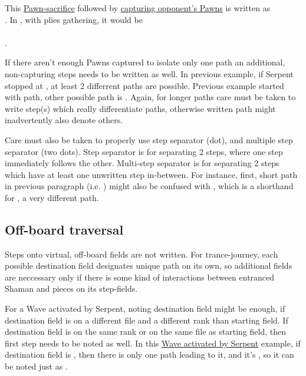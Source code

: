 This \hyperref[fig:scn_tr_13_pawn_sacrifice_init]{Pawn-sacrifice} followed by
\hyperref[fig:scn_tr_14_pawn_sacrifice_end]{capturing opponent's Pawns} is written as \\
. In , with plies
gathering, it would be \\
\alg{[Sr14-m15]\~{}[Am15-m11];;}\\
\alg{[Sm15..m17*..m19*.l20*.m21*.n20*.o21*]}.

If there aren't enough Pawns captured to isolate only one path an additional, non-capturing
steps needs to be written as well. In previous example, if Serpent stopped at , at
least 2 differrent paths are possible. Previous example started with
 path, other possible path is .
Again, for longer paths care must be taken to write step(s) which really differentiate paths,
otherwise written path might inadvertently also denote others.

Care must also be taken to properly use step separator  (dot), and multiple step
separator  (two dots). Step separator  is for separating 2 steps, where one
step immediately follows the other. Multi-step separator  is for separating 2 steps
which have at least one unwritten step in-between. For instance, first, short path in
previous paragraph (i.e. ) might also be confused with
, which is a shorthand for
, a very different path.

\subsection*{Off-board traversal}
\label{sec:Appendix/Notation/Off-board traversal}

Steps onto virtual, off-board fields are not written. For trance-journey, each possible
destination field designates unique path on its own, so additional fields are neccessary
only if there is some kind of interactions between entranced Shaman and pieces on its
step-fields.

For a Wave activated by Serpent, noting destination field might be enough, if destination
field is on a different file and a different rank than starting field. If destination field
is on the same rank or on the same file as starting field, then first step needs to be noted
as well. In this \hyperref[fig:scn_tr_18_serpent_activated_wave_ply]{Wave activated by Serpent}
example, if destination field is , then there is only one path leading to it, and
it's , so it can be noted just as .

